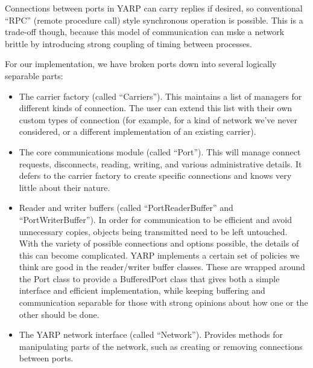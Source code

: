Connections between ports in YARP can carry replies if desired,
so conventional ``RPC'' (remote procedure call) style synchronous
operation is possible.  This is a trade-off though, because this
model of communication can mske a network brittle by introducing
strong coupling of timing between processes.



For our implementation, we have broken ports down into 
several logically separable parts:

\begin{itemize} \pflist

\item The carrier factory (called ``Carriers'').  This maintains
a list of managers for different kinds of connection.  The user
can extend this list with their own custom types of connection
(for example, for a kind of network we've never considered,
or a different implementation of an existing carrier).


\item The core communications module (called ``Port'').  This
will manage connect requests, disconnects, reading, writing,
and various administrative details.  It defers to the carrier
factory to create specific connections and knows very little
about their nature.

\item Reader and writer buffers (called ``PortReaderBuffer'' and
``PortWriterBuffer'').  In order for communication to be efficient and
avoid unnecessary copies, objects being transmitted need to be left
untouched.  With the variety of possible connections and options
possible, the details of this can become complicated.  YARP implements
a certain set of policies we think are good in the reader/writer
buffer classes.  These are wrapped around the Port class to provide a
BufferedPort class that gives both a simple interface and efficient
implementation, while keeping buffering and communication separable
for those with strong opinions about how one or the other should be
done.

\item The YARP network interface (called ``Network'').  Provides
methods for manipulating parts of the network, such as
creating or removing connections between ports.

\end{itemize}

